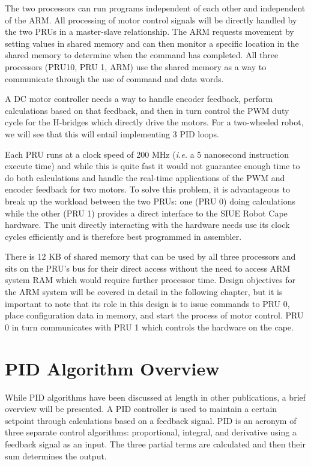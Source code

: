 \documentclass[12pt,oneside,final]{siuethesis}
\theoremstyle{definition}
\begin{document}
The two processors can run programs independent of each other and independent of the ARM. All processing of motor control signals will be directly handled by the two PRUs in a master-slave relationship. The ARM requests movement by setting values in shared memory and can then monitor a specific location in the shared memory to determine when the command has completed. All three processors (PRU10, PRU 1, ARM) use the shared memory as a way to communicate through the use of command and data words. 

A DC motor controller needs a way to handle encoder feedback, perform calculations based on that feedback, and then in turn control the PWM duty cycle for the H-bridges which directly drive the motors. For a two-wheeled robot, we will see that this will entail implementing 3 PID loops.

Each PRU runs at a clock speed of 200 MHz (\emph{i.e.} a 5 nanosecond instruction execute time) and while this is quite fast it would not guarantee enough time to do both calculations and handle the real-time applications of the PWM and encoder feedback for two motors. To solve this problem, it is advantageous to break up the workload between the two PRUs: one (PRU 0) doing calculations while the other (PRU 1) provides a direct interface to the SIUE Robot Cape hardware. The unit directly interacting with the hardware needs use its clock cycles efficiently and is therefore best programmed in assembler. 

There is 12 KB of shared memory that can be used by all three processors and sits on the PRU’s bus for their direct access without the need to access ARM system RAM which would require further processor time. Design objectives for the ARM system will be covered in detail in the following chapter, but it is important to note that its role in this design is to issue commands to PRU 0, place configuration data in memory, and start the process of motor control. PRU 0 in turn communicates with PRU 1 which controls the hardware on the cape.

\section{PID Algorithm Overview}

While PID algorithms have been discussed at length in other publications, a brief overview will be presented. A PID controller is used to maintain a certain setpoint through calculations based on a feedback signal. PID is an acronym of three separate control algorithms: proportional, integral, and derivative using a feedback signal as an input. The three partial terms are calculated and then their sum determines the output. 
\end{document}
